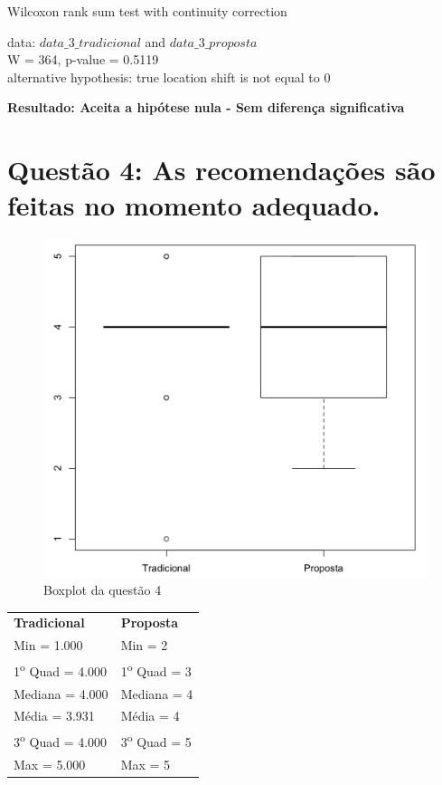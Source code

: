 Wilcoxon rank sum test with continuity correction

\noindent
data:  $data\_3\_tradicional$ and $data\_3\_proposta$\\
W = 364, p-value = 0.5119\\
alternative hypothesis: true location shift is not equal to 0

\noindent
\textbf{Resultado: Aceita a hipótese nula - Sem diferença significativa}

\newpage
\section{Questão 4: As recomendações são feitas no momento adequado.}

\begin{figure}[htb]
  \caption{\label{fig:questao4-boxplot}Boxplot da questão 4}
  \begin{center}
      \includegraphics[scale=0.4]{./Figuras/questao4-boxplot.png}
  \end{center}
\end{figure}

\begin{table}[h]
\begin{tabular}{p{}p{}}
\textbf{Tradicional} & \textbf{Proposta} \\
Min = 1.000 & Min = 2\\
1\textsuperscript{o} Quad = 4.000 & 1\textsuperscript{o} Quad = 3\\
Mediana = 4.000 & Mediana = 4\\
Média = 3.931 & Média = 4\\
3\textsuperscript{o} Quad = 4.000 & 3\textsuperscript{o} Quad = 5\\
Max = 5.000 & Max = 5\\
\end{tabular}
\end{table}

